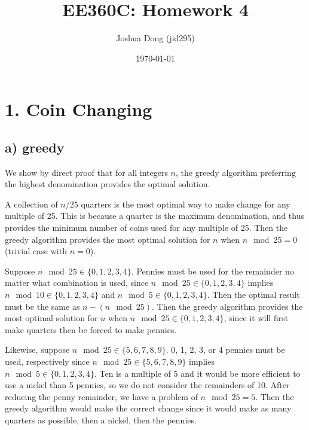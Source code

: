 \documentclass{article}
\begin{document}
\title{EE360C: Homework 4}
\author{Joshua Dong (jid295)}
\date{\today}
\maketitle

\section*{1. Coin Changing}
\subsection*{a) greedy}
\begin{algorithmic}
\end{algorithmic}
We show by direct proof that for all integers $n$, the greedy algorithm
preferring the highest denomination provides the optimal solution.

A collection of $n/25$ quarters is the most optimal way to make change for any
multiple of 25. This is because a quarter is the maximum denomination, and
thus provides the minimum number of coins used for any multiple of 25. Then
the greedy algorithm provides the most optimal solution for $n$ when
$n \mod 25 = 0$ (trivial case with $n = 0$).

Suppose
$n \mod 25 \in \{0, 1, 2, 3, 4\}$.
Pennies must be used for the remainder no matter what combination is used,
since
$n \mod 25 \in \{0, 1, 2, 3, 4\}$
implies
$n \mod 10 \in \{0, 1, 2, 3, 4\}$
and
$n \mod 5 \in \{0, 1, 2, 3, 4\}$.
Then the optimal result must be the same as $n - (n \mod 25)$. Then the greedy
algorithm provides the most optimal solution for $n$ when
$n \mod 25 \in \{0, 1, 2, 3, 4\}$, since it will first make quarters then
be forced to make pennies. 

Likewise, suppose
$n \mod 25 \in \{5, 6, 7, 8, 9\}$.
0, 1, 2, 3, or 4 pennies must be used, respectively since
$n \mod 25 \in \{5, 6, 7, 8, 9\}$
implies
$n \mod 5 \in \{0, 1, 2, 3, 4\}$.
Ten is a multiple of 5 and it would be more efficient to use a nickel than
5 pennies, so we do not consider the remainders of 10. After reducing the
penny remainder, we have a problem of $n \mod 25 = 5$. Then the greedy
algorithm would make the correct change since it would make as many
quarters as possible, then a nickel, then the pennies.
\end{document}
